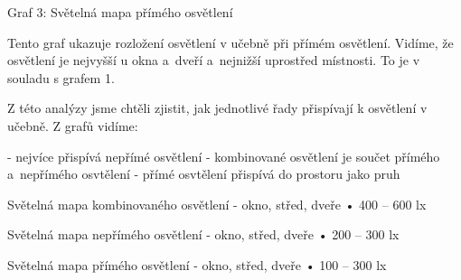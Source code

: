 Graf 3: Světelná mapa přímého osvětlení

Tento graf ukazuje rozložení osvětlení v učebně při přímém osvětlení. Vidíme, že osvětlení je nejvyšší
u okna a~dveří a~nejnižší uprostřed místnosti. To je v souladu s grafem 1.

Z této analýzy jsme chtěli zjistit, jak jednotlivé řady přispívají k osvětlení v učebně. Z grafů vidíme:

- nejvíce přispívá nepřímé osvětlení
- kombinované osvětlení je součet přímého a~nepřímého osvtělení
- přímé osvtělení přispívá do prostoru jako pruh

Světelná mapa kombinovaného osvětlení - okno, střed, dveře
    • 400 – 600 lx

Světelná mapa nepřímého osvětlení - okno, střed, dveře
    • 200 – 300 lx

Světelná mapa přímého osvětlení - okno, střed, dveře
    • 100 – 300 lx